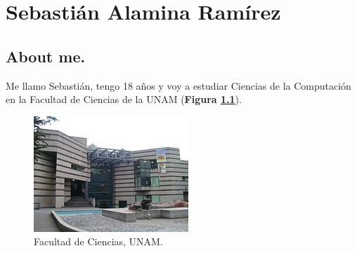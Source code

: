 \chapter{Sebastián Alamina Ramírez}

\section{About me.}
Me llamo Sebastián, tengo 18 años y voy a estudiar Ciencias de la Computación en la Facultad de Ciencias de la UNAM (\textbf{Figura \ref{fig:26}}).

\begin{figure}[h]
\centering
\includegraphics[scale=1]{IMG/26.jpg}
\caption{Facultad de Ciencias, UNAM.}
\label{fig:26}
\end{figure}
